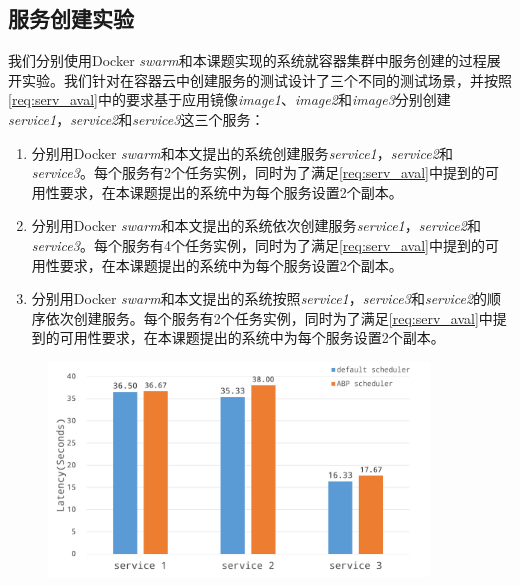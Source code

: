 \subsection{服务创建实验}\label{sec:serv_creation}
我们分别使用Docker \emph{swarm}和本课题实现的系统就容器集群中服务创建的过程展开实验。我们针对在容器云中创建服务的测试设计了三个不同的测试场景，并按照\ref{req:serv_aval}中的要求基于应用镜像\emph{image1}、\emph{image2}和\emph{image3}分别创建\emph{service1}，\emph{service2}和\emph{service3}这三个服务：
\begin{enumerate}
\item\label{create1} 分别用Docker \emph{swarm}和本文提出的系统创建服务\emph{service1}，\emph{service2}和\emph{service3}。每个服务有2个任务实例，同时为了满足\ref{req:serv_aval}中提到的可用性要求，在本课题提出的系统中为每个服务设置2个副本。
\item\label{create2} 分别用Docker \emph{swarm}和本文提出的系统依次创建服务\emph{service1}，\emph{service2}和\emph{service3}。每个服务有4个任务实例，同时为了满足\ref{req:serv_aval}中提到的可用性要求，在本课题提出的系统中为每个服务设置2个副本。
\item\label{create3} 分别用Docker \emph{swarm}和本文提出的系统按照\emph{service1}，\emph{service3}和\emph{service2}的顺序依次创建服务。每个服务有2个任务实例，同时为了满足\ref{req:serv_aval}中提到的可用性要求，在本课题提出的系统中为每个服务设置2个副本。
\end{enumerate}

\begin{figure}[htbp]
\centering
\includegraphics[width=0.9\textwidth]{./figure/baseline}
\end{figure}

